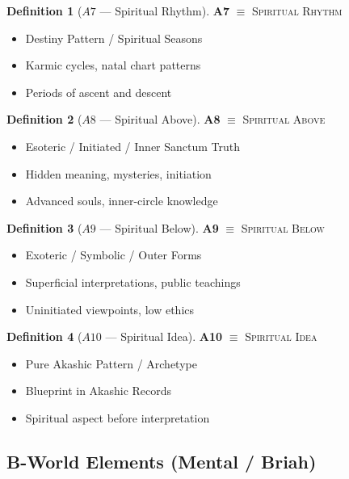 \documentclass[11pt,twoside,openright]{book}
\theoremstyle{definition}
\newtheorem{definition}{Definition}[chapter]
\theoremstyle{plain}
\theoremstyle{remark}
\begin{document}
\begin{definition}[$A7$ --- Spiritual Rhythm]
\label{def:A7}
\textbf{A7} $\equiv$ \textsc{Spiritual Rhythm}
\begin{itemize}
  \item Destiny Pattern / Spiritual Seasons
  \item Karmic cycles, natal chart patterns
  \item Periods of ascent and descent
\end{itemize}
\end{definition}

\begin{definition}[$A8$ --- Spiritual Above]
\label{def:A8}
\textbf{A8} $\equiv$ \textsc{Spiritual Above}
\begin{itemize}
  \item Esoteric / Initiated / Inner Sanctum Truth
  \item Hidden meaning, mysteries, initiation
  \item Advanced souls, inner-circle knowledge
\end{itemize}
\end{definition}

\begin{definition}[$A9$ --- Spiritual Below]
\label{def:A9}
\textbf{A9} $\equiv$ \textsc{Spiritual Below}
\begin{itemize}
  \item Exoteric / Symbolic / Outer Forms
  \item Superficial interpretations, public teachings
  \item Uninitiated viewpoints, low ethics
\end{itemize}
\end{definition}

\begin{definition}[$A10$ --- Spiritual Idea]
\label{def:A10}
\textbf{A10} $\equiv$ \textsc{Spiritual Idea}
\begin{itemize}
  \item Pure Akashic Pattern / Archetype
  \item Blueprint in Akashic Records
  \item Spiritual aspect before interpretation
\end{itemize}
\end{definition}

\subsection{B-World Elements (Mental / Briah)}
\end{document}
